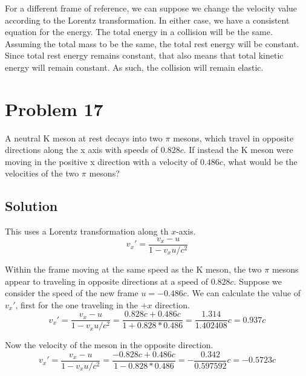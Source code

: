 \documentclass[12pt]{article}
\begin{document}
            For a different frame of reference, we can suppose we change the velocity value according to the Lorentz transformation.
            In either case, we have a consistent equation for the energy.
            The total energy in a collision will be the same.
            Assuming the total mass to be the same, the total rest energy will be constant.
            Since total rest energy remains constant, that also means that total kinetic energy will remain constant.
            As such, the collision will remain elastic.
    \pagebreak

\section{Problem 17} %
    A neutral K meson at rest decays into two $\pi$ mesons, which travel in opposite directions along the x axis with speeds of $0.828c$. 
    If instead the K meson were moving in the positive x direction with a velocity of $0.486c$, what would be the velocities of the two $\pi$ mesons?

    \subsection{Solution}
        This uses a Lorentz transformation along th $x$-axis.
        \begin{equation}
            v_x' = \frac{v_x - u}{1 - v_xu/c^2}
        \end{equation}

        Within the frame moving at the same speed as the K meson, the two $\pi$ mesons appear to traveling in opposite directions at a speed of $0.828c$.
        Suppose we consider the speed of the new frame $u = -0.486c$.
        We can calculate the value of $v_x'$, first for the one traveling in the $+x$ direction.
        \begin{equation}
            v_x'    =   \frac{v_x - u}{1 - v_xu/c^2}
                =   \frac{0.828c + 0.486c}{1 + 0.828*0.486}
                =   \frac{1.314}{1.402408} c
                =   \boxed{0.937c}
        \end{equation}

        Now the velocity of the meson in the opposite direction.
        \begin{equation}
            v_x'    =   \frac{v_x - u}{1 - v_xu/c^2}
                =   \frac{-0.828c + 0.486c}{1 - 0.828*0.486}
                =   -\frac{0.342}{0.597592} c
                =   \boxed{-0.5723c}
        \end{equation}
    \pagebreak
\end{document}
